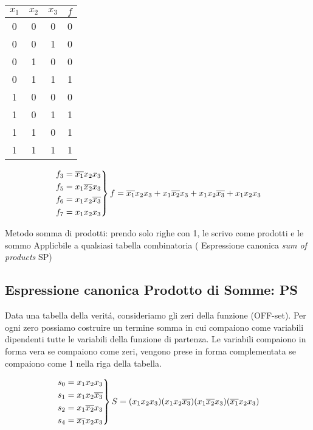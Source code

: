 \documentclass{article}
\begin{document}
\begin{center}
    \begin{tabular}{c c c|c}
        $x_1$ & $x_2$ & $x_3$ & $f$\\
        \hline{}
        0 & 0 & 0 & 0\\
        0 & 0 & 1 & 0\\
        0 & 1 & 0 & 0\\
        0 & 1 & 1 & 1\\
        \hline{}
        1 & 0 & 0 & 0\\
        1 & 0 & 1 & 1\\
        1 & 1 & 0 & 1\\
        1 & 1 & 1 & 1\\
    \end{tabular}
    \[
        \begin{rcases}
            f_3 = \overline{x_1} x_2 x_3\\
            f_5 = x_1 \overline{x_2} x_3\\
            f_6 = x_1 x_2 \overline{x_3}\\
            f_7 = x_1 x_2 x_3
        \end{rcases}
        f =  \overline{x_1} x_2 x_3 + x_1 \overline{x_2} x_3 +  x_1 x_2 \overline{x_3} + x_1 x_2 x_3
    \]
\end{center}

Metodo somma di prodotti: prendo solo righe con 1, le scrivo come prodotti e le sommo
Applicbile a qualsiasi tabella combinatoria ( Espressione canonica \textit{sum of products} SP)


\subsection{Espressione canonica Prodotto di Somme: PS}

Data una tabella della verit\'a, consideriamo gli zeri della funzione (OFF-set). Per ogni zero possiamo costruire un termine somma in cui compaiono come variabili dipendenti tutte le variabili della funzione di partenza.
Le variabili compaiono in forma vera se compaiono come zeri, vengono prese in forma complementata se compaiono come 1 nella riga della tabella.

\[
    \begin{rcases}
        s_0 = x_1 x_2 x_3\\
        s_1 = x_1 x_2 \overline{x_3}\\
        s_2 = x_1 \overline{x_2} x_3\\
        s_4 = \overline{x_1} x_2 x_3
    \end{rcases}
    S =  (x_1 x_2 x_3)(x_1 x_2 \overline{x_3})(x_1 \overline{x_2} x_3)(\overline{x_1} x_2 x_3)
\]
\end{document}
